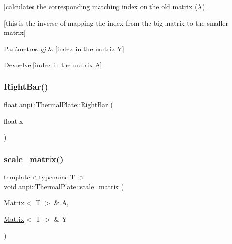 \mbox{[}calculates the corresponding matching index on the old matrix (A)\mbox{]} 

\mbox{[}this is the inverse of mapping the index from the big matrix to the smaller matrix\mbox{]}


\begin{DoxyParams}{Parámetros}
{\em yj} & \mbox{[}index in the matrix Y\mbox{]} \\
\hline
\end{DoxyParams}
\begin{DoxyReturn}{Devuelve}
\mbox{[}index in the matrix A\mbox{]} 
\end{DoxyReturn}
\mbox{\label{classanpi_1_1ThermalPlate_a227bb49bbfb8de325707360f88a1be01}} 
\subsubsection{\texorpdfstring{Right\+Bar()}{RightBar()}}
{\footnotesize\ttfamily float anpi\+::\+Thermal\+Plate\+::\+Right\+Bar (\begin{DoxyParamCaption}\item[{float}]{x }\end{DoxyParamCaption})\hspace{0.3cm}{\ttfamily [inline]}}

\mbox{\label{classanpi_1_1ThermalPlate_af85b4a7783b8ff9b4660c8a3e959d0a9}} 
\subsubsection{\texorpdfstring{scale\+\_\+matrix()}{scale\_matrix()}}
{\footnotesize\ttfamily template$<$typename T $>$ \\
void anpi\+::\+Thermal\+Plate\+::scale\+\_\+matrix (\begin{DoxyParamCaption}\item[{\hyperlink{classanpi_1_1Matrix}{Matrix}$<$ T $>$ \&}]{A,  }\item[{\hyperlink{classanpi_1_1Matrix}{Matrix}$<$ T $>$ \&}]{Y }\end{DoxyParamCaption})\hspace{0.3cm}{\ttfamily [inline]}}

